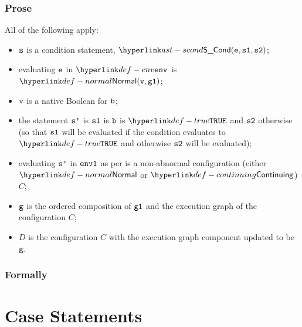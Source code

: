 \subsubsection{Prose}
All of the following apply:
\begin{itemize}
\item $\vs$ is a condition statement, $\SCond(\ve, \vsone, \vstwo)$;
\item evaluating $\ve$ in $\env$ is $\Normal(\vv, \vgone)$\ProseOrAbnormal;
\item $\vv$ is a native Boolean for $\vb$;
\item the statement $\vsp$ is $\vsone$ is $\vb$ is $\True$ and $\vstwo$ otherwise
(so that $\vsone$ will be evaluated if the condition evaluates to $\True$ and otherwise
$\vstwo$ will be evaluated);
\item evaluating $\vsp$ in $\envone$ as per  is a non-abnormal configuration
      (either $\Normal$ or $\Continuing$) $C$\ProseOrAbnormal;
\item $\vg$ is the ordered composition of $\vgone$ and the execution graph of the configuration $C$;
\item $D$ is the configuration $C$ with the execution graph component updated to be $\vg$.
\end{itemize}

\subsubsection{Formally}
\begin{mathpar}
\end{mathpar}

\section{Case Statements\label{sec:CaseStatements}}
